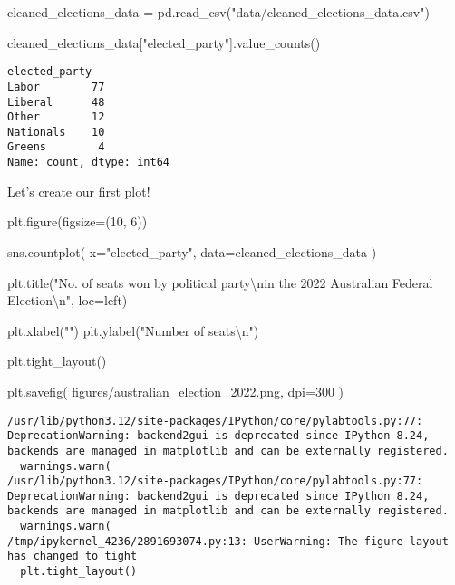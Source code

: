 \documentclass[
  letterpaper,
  DIV=11,
  numbers=noendperiod]{scrreprt}
\newenvironment{Shaded}{\begin{snugshade}}{\end{snugshade}}
\newcommand{\CharTok}[1]{\textcolor[rgb]{0.13,0.47,0.30}{#1}}
\newcommand{\DecValTok}[1]{\textcolor[rgb]{0.68,0.00,0.00}{#1}}
\newcommand{\NormalTok}[1]{\textcolor[rgb]{0.00,0.23,0.31}{#1}}
\newcommand{\OperatorTok}[1]{\textcolor[rgb]{0.37,0.37,0.37}{#1}}
\newcommand{\StringTok}[1]{\textcolor[rgb]{0.13,0.47,0.30}{#1}}
\begin{document}
\begin{Shaded}
\begin{Highlighting}[]
\NormalTok{cleaned\_elections\_data }\OperatorTok{=}\NormalTok{ pd.read\_csv(}\StringTok{"data/cleaned\_elections\_data.csv"}\NormalTok{)}
\end{Highlighting}
\end{Shaded}

\begin{Shaded}
\begin{Highlighting}[]
\NormalTok{cleaned\_elections\_data[}\StringTok{"elected\_party"}\NormalTok{].value\_counts()}
\end{Highlighting}
\end{Shaded}

\begin{verbatim}
elected_party
Labor        77
Liberal      48
Other        12
Nationals    10
Greens        4
Name: count, dtype: int64
\end{verbatim}

Let's create our first plot!

\begin{Shaded}
\begin{Highlighting}[]
\NormalTok{plt.figure(figsize}\OperatorTok{=}\NormalTok{(}\DecValTok{10}\NormalTok{, }\DecValTok{6}\NormalTok{))}

\NormalTok{sns.countplot(}
\NormalTok{    x}\OperatorTok{=}\StringTok{"elected\_party"}\NormalTok{, }
\NormalTok{    data}\OperatorTok{=}\NormalTok{cleaned\_elections\_data}
\NormalTok{)}

\NormalTok{plt.title(}\StringTok{"No. of seats won by political party}\CharTok{\textbackslash{}n}\StringTok{in the 2022 Australian Federal Election}\CharTok{\textbackslash{}n}\StringTok{"}\NormalTok{, loc}\OperatorTok{=}\StringTok{\textquotesingle{}left\textquotesingle{}}\NormalTok{)}

\NormalTok{plt.xlabel(}\StringTok{""}\NormalTok{)}
\NormalTok{plt.ylabel(}\StringTok{"Number of seats}\CharTok{\textbackslash{}n}\StringTok{"}\NormalTok{)}

\NormalTok{plt.tight\_layout()}

\NormalTok{plt.savefig(}
    \StringTok{\textquotesingle{}figures/australian\_election\_2022.png\textquotesingle{}}\NormalTok{, dpi}\OperatorTok{=}\DecValTok{300}
\NormalTok{)}
\end{Highlighting}
\end{Shaded}

\begin{verbatim}
/usr/lib/python3.12/site-packages/IPython/core/pylabtools.py:77: DeprecationWarning: backend2gui is deprecated since IPython 8.24, backends are managed in matplotlib and can be externally registered.
  warnings.warn(
/usr/lib/python3.12/site-packages/IPython/core/pylabtools.py:77: DeprecationWarning: backend2gui is deprecated since IPython 8.24, backends are managed in matplotlib and can be externally registered.
  warnings.warn(
/tmp/ipykernel_4236/2891693074.py:13: UserWarning: The figure layout has changed to tight
  plt.tight_layout()
\end{verbatim}
\end{document}
